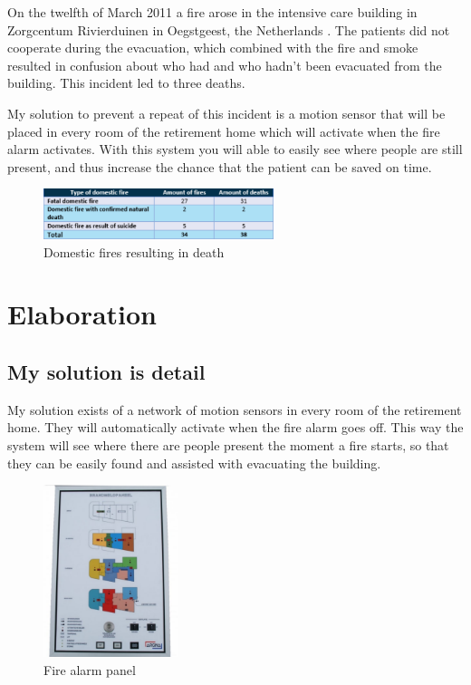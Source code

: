 \documentclass[12pt]{report}
\begin{document}
On the twelfth of March 2011 a fire arose in the intensive care building in Zorgcentum Rivierduinen in Oegstgeest, the Netherlands \cite{2012}. The patients did not cooperate during the evacuation, which combined with the fire and smoke resulted in confusion about who had and who hadn’t been evacuated from the building. This incident led to three deaths.

My solution to prevent a repeat of this incident is a motion sensor that will be placed in every room of the retirement home which will activate when the fire alarm activates. With this system you will able to easily see where people are still present, and thus increase the chance that the patient can be saved on time.
\begin{figure}[!ht]
	\centering
	\includegraphics[width=0.6\textwidth]{images/Tabel_Doden_brand.pdf}
	\caption{Domestic fires resulting in death}
	\centering
	\label{label:file_name}
\end{figure}


\chapter{Elaboration}
\section{My solution is detail}
My solution exists of a network of motion sensors in every room of the retirement home. They will automatically activate when the fire alarm goes off. This way the system will see where there are people present the moment a fire starts, so that they can be easily found and assisted with evacuating the building.

\begin{figure}
	\vspace{-40pt}
	\begin{center}
		\includegraphics[width=0.35\textwidth]{images/brandpaneel.pdf}
	\end{center}
	\vspace{-20pt}
	\caption{Fire alarm panel}
	\label{label:file_name}
\end{figure}
\end{document}
